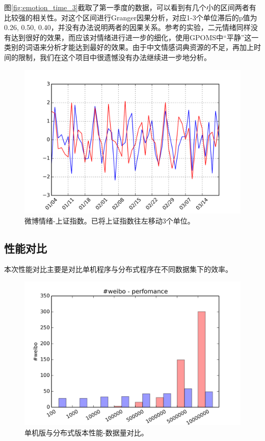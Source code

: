 \documentclass[12pt, oneside]{article}
\begin{document}
\begin{spacing}{1.5}
\begin{CJK}{UTF8}{gbsn}
图\ref{fig:emotion_time_3}截取了第一季度的数据，可以看到有几个小的区间两者有比较强的相关性。对这个区间进行Granger因果分析，对应1-3个单位滞后的p值为0.26, 0.50, 0.40，并没有办法说明两者的因果关系。参考\cite{bollen2011twitter}的实验，二元情绪同样没有达到很好的效果，而应该对情绪进行进一步的细化，使用GPOMS中“平静”这一类别的词语来分析才能达到最好的效果。由于中文情感词典资源的不足\cite{deng2014}，再加上时间的限制，我们在这个项目中很遗憾没有办法继续进一步地分析。

\begin{figure}
	\centering
	\includegraphics[width=0.8\linewidth]{../result/charts/emotion_price_offset3}
	\caption{微博情绪-上证指数。已将上证指数往左移动3个单位。}
	\label{fig:emotion_stock}
\end{figure}

\subsection{性能对比}
本次性能对比主要是对比单机程序与分布式程序在不同数据集下的效率。
\begin{figure}
	\centering
	\includegraphics[width=0.8\linewidth]{../result/charts/performance}
	\caption{单机版与分布式版本性能-数据量对比。}
	\label{fig:performance}
\end{figure}


\end{CJK}
\end{spacing}
\end{document}
